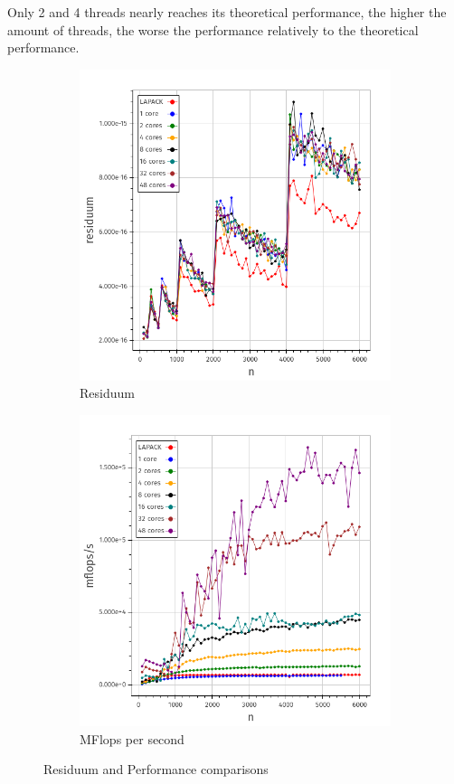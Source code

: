 \documentclass[a4paper,final,ngerman,english]{article}
\begin{document}
Only 2 and 4 threads nearly reaches its theoretical performance, the higher the amount of threads,
the worse the performance relatively to the theoretical performance.

\begin{figure}[h!]
	\centering
	\begin{subfigure}{0.46\textwidth}
	\includegraphics[width=\textwidth]{res}
	\caption{Residuum}
\label{fig:residuum}
	\end{subfigure}
	\begin{subfigure}{0.46\textwidth}
	\includegraphics[width=\textwidth]{mflops}
	\caption{MFlops per second}
\label{fig:mflops}
	\end{subfigure}
	\caption{Residuum and Performance comparisons}
\end{figure}
\end{document}
